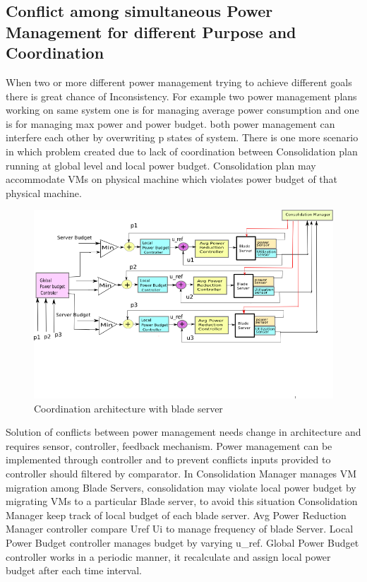 \documentclass[seminar,twoside]{iitbreport}
\begin{document}
\subsection{Conflict among simultaneous Power Management for different Purpose and Coordination}
When two or more different power management trying to achieve different goals there is great chance of Inconsistency.
For example two power management plans working on same system one is for managing average power consumption and one is for managing
max power and power budget.
both power management can interfere each other by overwriting p states of system.
There is one more scenario in which problem created due to lack of coordination between Consolidation plan running at global level and
local power budget.
Consolidation plan may accommodate VMs on physical machine which violates power budget of that physical machine\cite{nostruggle}.\par
\begin{figure}[!htb]
\label{arch}
\label{fig-circles}
\centering
\includegraphics[scale =0.6]{arch.png}
\caption{Coordination architecture with blade server\cite{nostruggle}}
\end{figure}
Solution of conflicts between power management needs change in architecture and requires sensor, controller, feedback mechanism.
Power management can be implemented through controller and to prevent conflicts inputs provided to controller should filtered by comparator. 
In \label{arch} Consolidation Manager manages VM migration among Blade Servers, consolidation may violate local power budget by
migrating VMs to a particular Blade server, to avoid this situation Consolidation Manager keep track of local budget of each blade server.
Avg Power Reduction Manager controller compare Uref Ui to manage frequency of blade Server. Local Power Budget controller manages budget by
varying u\_ref. Global Power Budget controller works in a periodic manner, it recalculate and assign local power budget after each time interval.  
\end{document}
